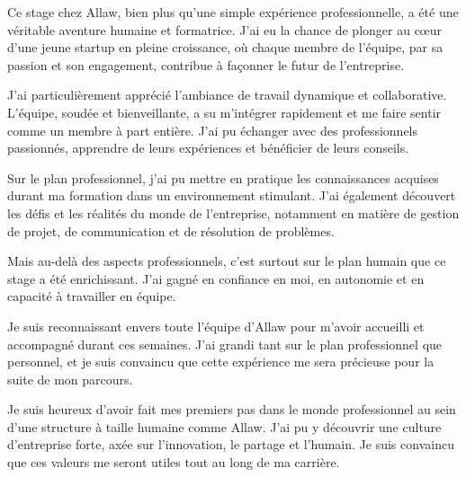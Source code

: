 Ce stage chez Allaw, bien plus qu'une simple expérience professionnelle, a été
une véritable aventure humaine et formatrice. J'ai eu la chance de plonger au
cœur d'une jeune startup en pleine croissance, où chaque membre de l'équipe, par
sa passion et son engagement, contribue à façonner le futur de l'entreprise.

J'ai particulièrement apprécié l'ambiance de travail dynamique et collaborative.
L'équipe, soudée et bienveillante, a su m'intégrer rapidement et me faire
sentir comme un membre à part entière. J'ai pu échanger avec des professionnels
passionnés, apprendre de leurs expériences et bénéficier de leurs conseils.

Sur le plan professionnel, j'ai pu mettre en pratique les connaissances acquises
durant ma formation dans un environnement stimulant. J'ai également découvert
les défis et les réalités du monde de l'entreprise, notamment en matière de
gestion de projet, de communication et de résolution de problèmes.

Mais au-delà des aspects professionnels, c'est surtout sur le plan humain que
ce stage a été enrichissant. J'ai gagné en confiance en moi, en autonomie et en
capacité à travailler en équipe.

Je suis reconnaissant envers toute l'équipe d'Allaw pour m'avoir accueilli et
accompagné durant ces semaines. J'ai grandi tant sur le plan professionnel que
personnel, et je suis convaincu que cette expérience me sera précieuse pour la
suite de mon parcours.

Je suis heureux d'avoir fait mes premiers pas dans le monde professionnel au
sein d'une structure à taille humaine comme Allaw. J'ai pu y découvrir une
culture d'entreprise forte, axée sur l'innovation, le partage et l'humain. Je
suis convaincu que ces valeurs me seront utiles tout au long de ma carrière.
